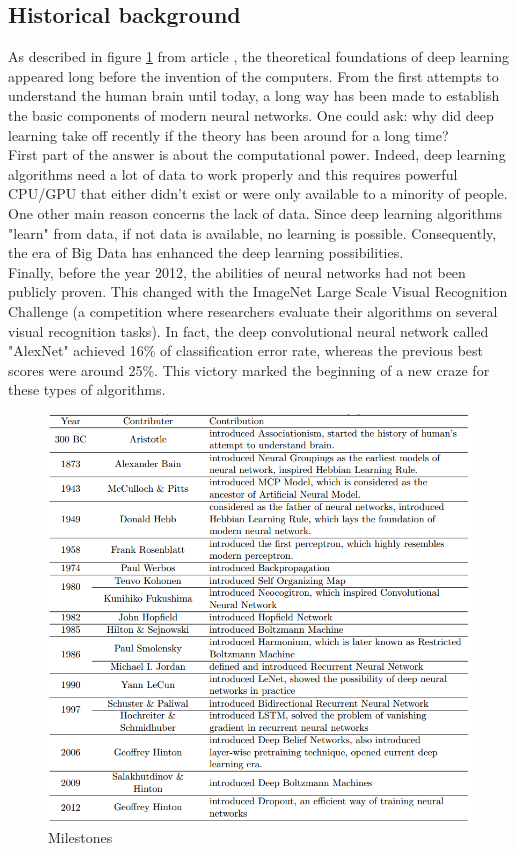 \subsection{Historical background}
\label{historical_background}
As described in figure \ref{history} from article \cite{14}, the theoretical foundations of deep learning appeared long before the invention of the computers. From the first attempts to understand the human brain until today, a long way has been made to establish the basic components of modern neural networks. One could ask: why did deep learning take off recently if the theory has been around for a long time?\\
First part of the answer is about the computational power. Indeed, deep learning algorithms need a lot of data to work properly and this requires powerful CPU/GPU that either didn't exist or were only available to a minority of people. \\
One other main reason concerns the lack of data. Since deep learning algorithms "learn" from data, if not data is available, no learning is possible. Consequently, the era of Big Data has enhanced the deep learning possibilities.\\
Finally, before the year 2012, the abilities of neural networks had not been publicly proven. This changed with the ImageNet Large Scale Visual Recognition Challenge (a competition where researchers evaluate their algorithms on several visual recognition tasks). In fact, the deep convolutional neural network called "AlexNet" achieved 16\% of classification error rate, whereas the previous best scores were around 25\%. This victory marked the beginning of a new craze for these types of algorithms.



\begin{figure}[!h]
\centering
\includegraphics[width=1\textwidth, keepaspectratio=true]{./figures/history.png}
\caption{Milestones }
\label{history}
\end{figure}


